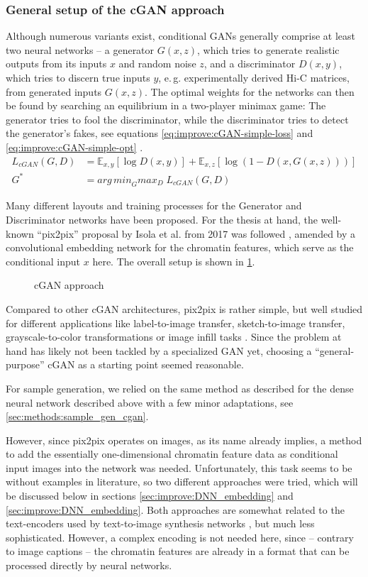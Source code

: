 \subsubsection{General setup of the cGAN approach}
Although numerous variants exist, conditional GANs generally comprise at least two neural networks -- 
a generator $G(x,z)$, which tries to generate realistic outputs from its inputs $x$ and random noise $z$, and a discriminator $D(x,y)$,
which tries to discern true inputs $y$, e.\,g. experimentally derived Hi-C matrices, from generated inputs $G(x,z)$.
The optimal weights for the networks can then be found by searching an equilibrium in a two-player minimax game:
The generator tries to fool the discriminator, while the discriminator tries to detect the generator's fakes, 
see equations \ref{eq:improve:cGAN-simple-loss} and \ref{eq:improve:cGAN-simple-opt} \cite{Isola2017}.
\begin{align}
 L_\mathit{cGAN}(G, D) &= \mathbb{E}_{x,y}[\log D(x,y)] + \mathbb{E}_{x,z}[\log(1-D(x, G(x,z)))] \label{eq:improve:cGAN-simple-loss} \\
 G^* &=  \mathit{arg\,min}_G \mathit{max}_D \; L_\mathit{cGAN}(G, D) \label{eq:improve:cGAN-simple-opt}
\end{align}

Many different layouts and training processes for the Generator and Discriminator networks have been proposed.
For the thesis at hand, the well-known ``pix2pix'' proposal by Isola et al. from 2017 was followed \cite{Isola2017}, 
amended by a convolutional embedding network for the chromatin features, which serve as the conditional input $x$ here.
The overall setup is shown in \cref{fig:improve:cGAN-approach}.
\begin{figure}[hbp]
 \caption{cGAN approach} \label{fig:improve:cGAN-approach}
\end{figure}
Compared to other cGAN architectures, pix2pix is rather simple, but well studied for different applications like label-to-image transfer,
sketch-to-image transfer, grayscale-to-color transformations or image infill tasks \cite{Isola2017}.
Since the problem at hand has likely not been tackled by a specialized GAN yet, 
choosing a ``general-purpose'' cGAN as a starting point seemed reasonable.

For sample generation, we relied on the same method as described for the dense neural network described above
with a few minor adaptations, see \cref{sec:methods:sample_gen_cgan}.

However, since pix2pix operates on images, as its name already implies, 
a method to add the essentially one-dimensional chromatin feature data as conditional input images into the network was needed.
Unfortunately, this task seems to be without examples in literature, so two different approaches were tried,
which will be discussed below in sections \ref{sec:improve:DNN_embedding} and \ref{sec:improve:DNN_embedding}.
Both approaches are somewhat related to the text-encoders used by text-to-image synthesis networks 
\cite{Reed2016b,Xu2018}, but much less sophisticated. 
However, a complex encoding is not needed here, since -- contrary to image captions -- the chromatin features are already in a format that can be processed directly by neural networks.

